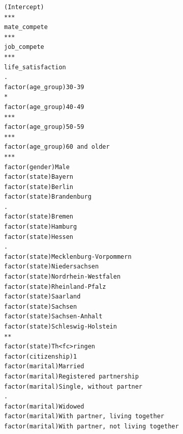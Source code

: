 \documentclass[
]{article}
\begin{document}
\begin{table}
\begin{minipage}[t]{\linewidth}
{\begin{verbatim}
(Intercept)                                                                       ***
mate_compete                                                                      ***
job_compete                                                                       ***
life_satisfaction                                                                 .  
factor(age_group)30-39                                                            *  
factor(age_group)40-49                                                            ***
factor(age_group)50-59                                                            ***
factor(age_group)60 and older                                                     ***
factor(gender)Male                                                                   
factor(state)Bayern                                                                  
factor(state)Berlin                                                                  
factor(state)Brandenburg                                                          .  
factor(state)Bremen                                                                  
factor(state)Hamburg                                                                 
factor(state)Hessen                                                               .  
factor(state)Mecklenburg-Vorpommern                                                  
factor(state)Niedersachsen                                                           
factor(state)Nordrhein-Westfalen                                                     
factor(state)Rheinland-Pfalz                                                         
factor(state)Saarland                                                                
factor(state)Sachsen                                                                 
factor(state)Sachsen-Anhalt                                                          
factor(state)Schleswig-Holstein                                                   ** 
factor(state)Th<fc>ringen                                                            
factor(citizenship)1                                                                 
factor(marital)Married                                                               
factor(marital)Registered partnership                                                
factor(marital)Single, without partner                                            .  
factor(marital)Widowed                                                               
factor(marital)With partner, living together                                         
factor(marital)With partner, not living together                                     

\end{verbatim}}
\end{minipage}
\end{table}
\end{document}
